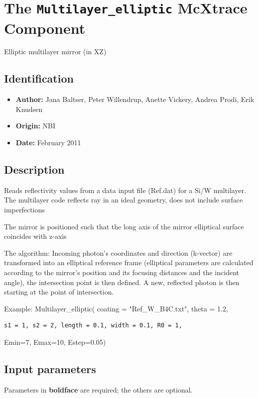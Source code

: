 \section{The \texttt{Multilayer\_elliptic} McXtrace Component}
Elliptic multilayer mirror (in XZ)

\subsection*{Identification}
\begin{itemize}
  \item \textbf{Author:} Jana Baltser, Peter Willendrup, Anette Vickery, Andrea Prodi, Erik Knudsen
  \item \textbf{Origin:} NBI
  \item \textbf{Date:} February 2011
\end{itemize}

\subsection*{Description}
Reads reflectivity values from a data input file (Ref.dat) for a Si/W multilayer. The multilayer code reflects ray in an ideal geometry, does not include surface imperfections

The mirror is positioned such that the long axis of the mirror elliptical surface coincides with z-axis

The algorithm: Incoming photon's coordinates and direction (k-vector) are transformed into an elliptical reference frame (elliptical parameters are calculated according to the mirror's position and its focusing distances and the incident angle), the intersection point is then defined. A new, reflected photon is then starting at the point of intersection.

Example: Multilayer\_elliptic( coating = "Ref\_W\_B4C.txt", theta = 1.2,

\begin{verbatim}
s1 = 1, s2 = 2, length = 0.1, width = 0.1, R0 = 1,
\end{verbatim}

Emin=7, Emax=10, Estep=0.05)

\subsection*{Input parameters}
Parameters in \textbf{boldface} are required; the others are optional.


